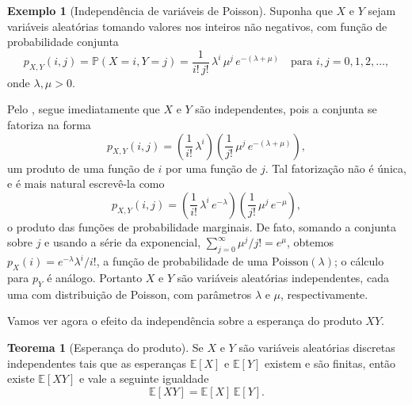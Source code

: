 \documentclass[12pt,portuguese]{article}
\theoremstyle{definition}
\newtheorem{theorem}{Teorema}
\newtheorem{example}[example]{Exemplo}
\begin{document}
\begin{example}[Independência de variáveis de Poisson]\label{ex:independencia-poisson}
Suponha que $X$ e $Y$ sejam variáveis aleatórias tomando valores nos inteiros
não negativos, com função de probabilidade conjunta
\[
p_{X,Y}(i, j) = \mathbb{P}(X = i, Y = j)
= \frac{1}{i!\,j!}\,\lambda^i\,\mu^j\,e^{-(\lambda+\mu)}
\quad \text{para } i, j = 0, 1, 2, \ldots,
\]
onde $\lambda, \mu > 0$.

Pelo , segue imediatamente que $X$ e $Y$ são
independentes, pois a conjunta se fatoriza na forma
\[
p_{X,Y}(i, j)
= \left( \frac{1}{i!}\,\lambda^i \right)
\left( \frac{1}{j!}\,\mu^j\,e^{-(\lambda+\mu)} \right),
\]
um produto de uma função de $i$ por uma função de $j$. Tal fatorização não é
única, e é mais natural escrevê-la como
\[
p_{X,Y}(i, j)
= \left( \frac{1}{i!}\,\lambda^i\,e^{-\lambda} \right)
\left( \frac{1}{j!}\,\mu^j\,e^{-\mu} \right),
\]
o produto das funções de probabilidade marginais. De fato, somando a conjunta
sobre $j$ e usando a série da exponencial, $\sum_{j=0}^{\infty}\mu^j/j! = e^\mu$,
obtemos $p_X(i) = e^{-\lambda}\lambda^i/i!$, a função de probabilidade de uma
$\mathrm{Poisson}(\lambda)$; o cálculo para $p_Y$ é análogo. Portanto $X$ e $Y$
são variáveis aleatórias independentes, cada uma com distribuição de Poisson,
com parâmetros $\lambda$ e $\mu$, respectivamente.
\end{example}

Vamos ver agora o efeito da independência sobre a esperança do produto $XY$.

\begin{theorem}[Esperança do produto]\label{thm:produto-esperanca}
Se $X$ e $Y$ são variáveis aleatórias discretas independentes tais que
as esperanças $\mathbb{E}[X]$ e $\mathbb{E}[Y]$ existem e são finitas,
então existe $\mathbb{E}[XY]$ e vale a seguinte igualdade
\[
\mathbb{E}[XY] = \mathbb{E}[X]\,\mathbb{E}[Y].
\]
\end{theorem}
\end{document}
